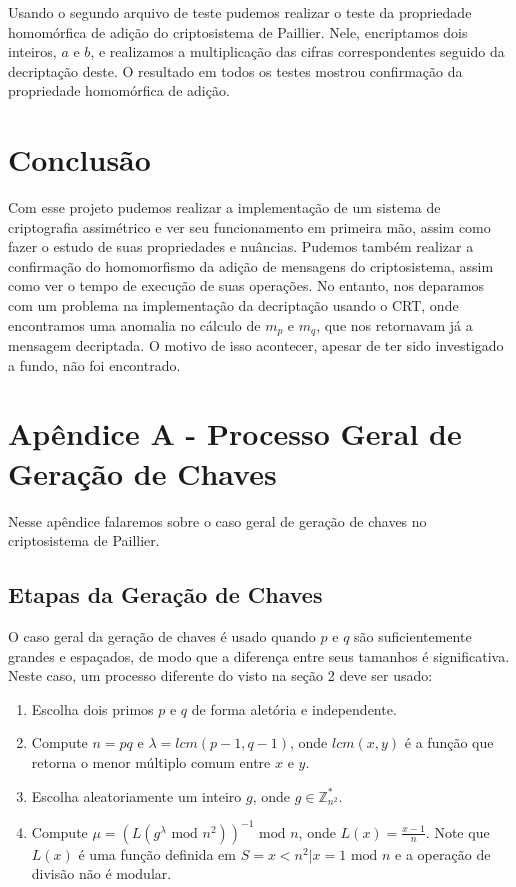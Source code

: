 \documentclass[10pt]{article}
\begin{document}
        Usando o segundo arquivo de teste pudemos realizar o teste da propriedade homomórfica de adição do criptosistema de Paillier. Nele, encriptamos dois inteiros, $a$ e $b$, e realizamos a multiplicação das cifras correspondentes seguido da decriptação deste. O resultado em todos os testes mostrou confirmação da propriedade homomórfica de adição.

    \section{Conclusão}
        Com esse projeto pudemos realizar a implementação de um sistema de criptografia assimétrico e ver seu funcionamento em primeira mão, assim como fazer o estudo de suas propriedades e nuâncias. Pudemos também realizar a confirmação do homomorfismo da adição de mensagens do criptosistema, assim como ver o tempo de execução de suas operações. No entanto, nos deparamos com um problema na implementação da decriptação usando o CRT, onde encontramos uma anomalia no cálculo de $m_p$ e $m_q$, que nos retornavam já a mensagem decriptada. O motivo de isso acontecer, apesar de ter sido investigado a fundo, não foi encontrado. 

        \newpage

    \section*{Apêndice A - Processo Geral de Geração de Chaves}
        Nesse apêndice falaremos sobre o caso geral de geração de chaves no criptosistema de Paillier.

        \subsection*{Etapas da Geração de Chaves}
            O caso geral da geração de chaves é usado quando $p$ e $q$ são suficientemente grandes e espaçados, de modo que a diferença entre seus tamanhos é significativa. Neste caso, um processo diferente do visto na seção 2 deve ser usado:

            \begin{enumerate}
                \item Escolha dois primos $p$ e $q$ de forma aletória e independente.
                \item Compute $n = pq$ e $\lambda = lcm(p-1, q-1)$, onde $lcm(x,y)$ é a função que retorna o menor múltiplo comum entre $x$ e $y$.
                \item Escolha aleatoriamente um inteiro $g$, onde $g \in \mathbb{Z}^*_{n^2}$.
                \item Compute $\mu = (L(g^{\lambda}\text{ mod } n^2))^{-1} \text{ mod } n$, onde $L(x) = \frac{x - 1}{n}$. Note que $L(x)$ é uma função definida em $S = {x < n^2 | x = 1 \text{ mod } n}$ e a operação de divisão não é modular.
            \end{enumerate}
\end{document}
